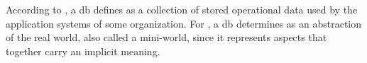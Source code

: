 According to , a \ac{db} defines as a collection of stored operational data used by the application systems of some organization.
For , a \ac{db} determines as an abstraction of the real world, also called a mini-world, since it represents aspects that together carry an implicit meaning.


